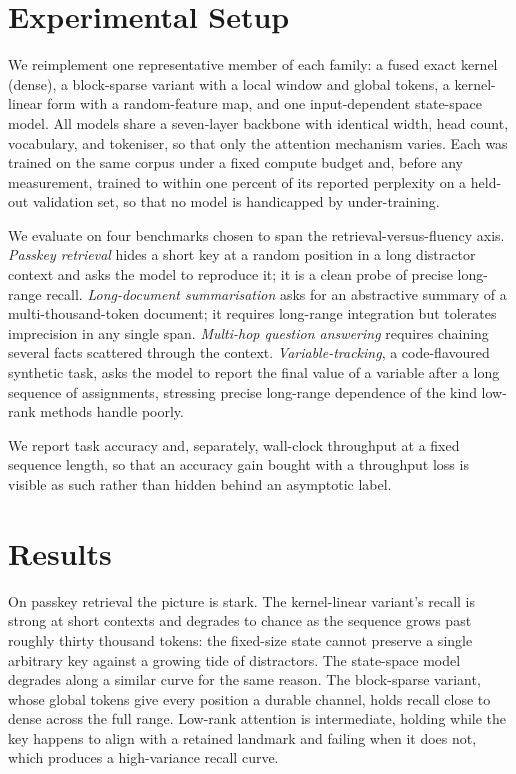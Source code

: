 \documentclass[11pt]{article}
\begin{document}
\section{Experimental Setup}
\label{sec:setup}

We reimplement one representative member of each family: a fused exact kernel (dense), a block-sparse variant with a local window and global tokens, a kernel-linear form with a random-feature map, and one input-dependent state-space model. All models share a seven-layer backbone with identical width, head count, vocabulary, and tokeniser, so that only the attention mechanism varies. Each was trained on the same corpus under a fixed compute budget and, before any measurement, trained to within one percent of its reported perplexity on a held-out validation set, so that no model is handicapped by under-training.

We evaluate on four benchmarks chosen to span the retrieval-versus-fluency axis. \emph{Passkey retrieval} hides a short key at a random position in a long distractor context and asks the model to reproduce it; it is a clean probe of precise long-range recall. \emph{Long-document summarisation} asks for an abstractive summary of a multi-thousand-token document; it requires long-range integration but tolerates imprecision in any single span. \emph{Multi-hop question answering} requires chaining several facts scattered through the context. \emph{Variable-tracking}, a code-flavoured synthetic task, asks the model to report the final value of a variable after a long sequence of assignments, stressing precise long-range dependence of the kind low-rank methods handle poorly.

We report task accuracy and, separately, wall-clock throughput at a fixed sequence length, so that an accuracy gain bought with a throughput loss is visible as such rather than hidden behind an asymptotic label.

\section{Results}
\label{sec:results}

On passkey retrieval the picture is stark. The kernel-linear variant's recall is strong at short contexts and degrades to chance as the sequence grows past roughly thirty thousand tokens: the fixed-size state cannot preserve a single arbitrary key against a growing tide of distractors. The state-space model degrades along a similar curve for the same reason. The block-sparse variant, whose global tokens give every position a durable channel, holds recall close to dense across the full range. Low-rank attention is intermediate, holding while the key happens to align with a retained landmark and failing when it does not, which produces a high-variance recall curve.
\end{document}
